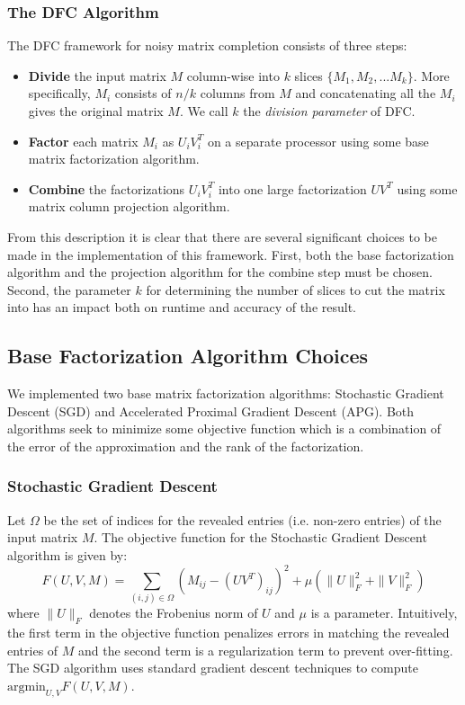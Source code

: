 \subsubsection{The DFC Algorithm}
The DFC framework for noisy matrix completion consists of three steps:
\begin{itemize}
\item \textbf{Divide} the input matrix $M$ column-wise into $k$ slices $\{M_1,M_2,...M_k\}$. More specifically, $M_i$ consists of $n/k$ columns from $M$ and concatenating all the $M_i$ gives the original matrix $M$. We call $k$ the \emph{division parameter} of DFC.
\item \textbf{Factor} each matrix $M_i$ as $U_i V_i^T$ on a separate processor using some base matrix factorization algorithm.
\item \textbf{Combine} the factorizations $U_iV_i^T$ into one large factorization $UV^T$ using some matrix column projection algorithm.
\end{itemize}
From this description it is clear that there are several significant choices to be made in the implementation of this framework. First, both the base factorization algorithm and the projection algorithm for the combine step must be chosen. Second, the parameter $k$ for determining the number of slices to cut the matrix into has an impact both on runtime and accuracy of the result.

\subsection{Base Factorization Algorithm Choices}
We implemented two base matrix factorization algorithms: Stochastic Gradient Descent (SGD) and Accelerated Proximal Gradient Descent (APG). Both algorithms seek to minimize some objective function which is a combination of the error of the approximation and the rank of the factorization.
\subsubsection{Stochastic Gradient Descent}
Let $\Omega$ be the set of indices for the revealed entries (i.e. non-zero entries) of the input matrix $M$. The objective function for the Stochastic Gradient Descent algorithm is given by:
\[
F(U,V,M) = \sum_{(i,j)\in \Omega} \left(M_{ij} - (UV^T)_{ij}\right)^2 + \mu (\| U\|^2_F  + \| V\|^2_F)
\]
where $\|U\|_F$ denotes the Frobenius norm of $U$ and $\mu$ is a parameter. Intuitively, the first term in the objective function penalizes errors in matching the revealed entries of $M$ and the second term is a regularization term to prevent over-fitting. The SGD algorithm uses standard gradient descent techniques to compute $\mbox{argmin}_{U,V} F(U,V,M)$. 

